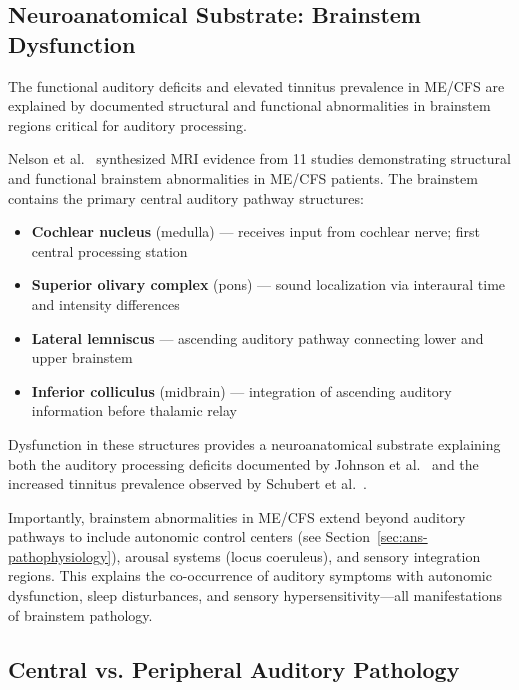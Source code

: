 \subsection{Neuroanatomical Substrate: Brainstem Dysfunction}

The functional auditory deficits and elevated tinnitus prevalence in ME/CFS are explained by documented structural and functional abnormalities in brainstem regions critical for auditory processing.

\begin{achievement}
\label{ach:nelson2021-brainstem}
Nelson et al.~\cite{Nelson2021} synthesized MRI evidence from 11 studies demonstrating structural and functional brainstem abnormalities in ME/CFS patients. The brainstem contains the primary central auditory pathway structures:

\begin{itemize}
    \item \textbf{Cochlear nucleus} (medulla) --- receives input from cochlear nerve; first central processing station
    \item \textbf{Superior olivary complex} (pons) --- sound localization via interaural time and intensity differences
    \item \textbf{Lateral lemniscus} --- ascending auditory pathway connecting lower and upper brainstem
    \item \textbf{Inferior colliculus} (midbrain) --- integration of ascending auditory information before thalamic relay
\end{itemize}

Dysfunction in these structures provides a neuroanatomical substrate explaining both the auditory processing deficits documented by Johnson et al.~\cite{Johnson1996} and the increased tinnitus prevalence observed by Schubert et al.~\cite{Schubert2021}.
\end{achievement}

Importantly, brainstem abnormalities in ME/CFS extend beyond auditory pathways to include autonomic control centers (see Section~\ref{sec:ans-pathophysiology}), arousal systems (locus coeruleus), and sensory integration regions. This explains the co-occurrence of auditory symptoms with autonomic dysfunction, sleep disturbances, and sensory hypersensitivity---all manifestations of brainstem pathology.

\subsection{Central vs. Peripheral Auditory Pathology}

